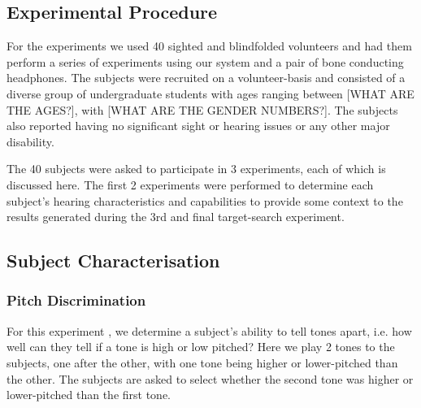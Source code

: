 \documentclass[format=sigconf, review=true, screen=true, anonymous=true]{acmart}
\begin{document}


\subsection{Experimental Procedure}

For the experiments we used 40 sighted and blindfolded volunteers and had them perform a series of experiments using our system and a pair of bone conducting headphones. The subjects were recruited on a volunteer-basis and consisted of a diverse group of undergraduate students with ages ranging between [WHAT ARE THE AGES?], with [WHAT ARE THE GENDER NUMBERS?]. The subjects also reported having no significant sight or hearing issues or any other major disability. 

The 40 subjects were asked to participate in 3 experiments, each of which is discussed here. The first 2 experiments were performed to determine each subject's hearing characteristics and capabilities to provide some context to the results generated during the 3rd and final target-search experiment. 

\subsection{Subject Characterisation}

\subsubsection{Pitch Discrimination}

For this experiment , we determine a subject's ability to tell tones apart, i.e. how well can they tell if a tone is high or low pitched? Here we play 2 tones to the subjects, one after the other, with one tone being higher or lower-pitched than the other. The subjects are asked to select whether the second tone was higher or lower-pitched than the first tone.
\end{document}
